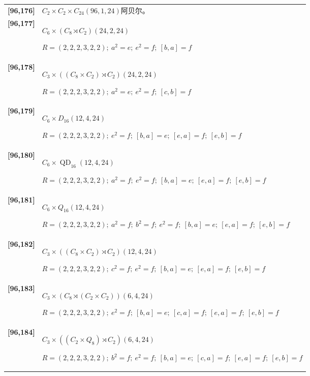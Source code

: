 \documentclass[UTF8,fontset=fandol,11pt,a4paper]{ctexart}
\begin{document}
\begin{longtable}{@{}p{17mm}>{\raggedright\arraybackslash}p{141mm}@{}}
\textbf{[96,176]} & $C_{2}\times C_{2}\times C_{24}$\quad $(96,1,24)$\quad 阿贝尔。\\[3pt]

\textbf{[96,177]} & $C_{6}\times (C_{8}\rtimes C_{2})$\quad $(24,2,24)$\par\(R=(2,2,2,3,2,2);\allowbreak\ a^{2}=e;\allowbreak\ e^{2}=f;\allowbreak\ [b,a]=f\)\\[3pt]

\textbf{[96,178]} & $C_{3}\times ((C_{8}\times C_{2})\rtimes C_{2})$\quad $(24,2,24)$\par\(R=(2,2,2,3,2,2);\allowbreak\ a^{2}=e;\allowbreak\ e^{2}=f;\allowbreak\ [c,b]=f\)\\[3pt]

\textbf{[96,179]} & $C_{6}\times D_{16}$\quad $(12,4,24)$\par\(R=(2,2,2,3,2,2);\allowbreak\ e^{2}=f;\allowbreak\ [b,a]=e;\allowbreak\ [e,a]=f;\allowbreak\ [e,b]=f\)\\[3pt]

\textbf{[96,180]} & $C_{6}\times \operatorname{QD}_{16}$\quad $(12,4,24)$\par\(R=(2,2,2,3,2,2);\allowbreak\ a^{2}=f;\allowbreak\ e^{2}=f;\allowbreak\ [b,a]=e;\allowbreak\ [e,a]=f;\allowbreak\ [e,b]=f\)\\[3pt]

\textbf{[96,181]} & $C_{6}\times Q_{16}$\quad $(12,4,24)$\par\(R=(2,2,2,3,2,2);\allowbreak\ a^{2}=f;\allowbreak\ b^{2}=f;\allowbreak\ e^{2}=f;\allowbreak\ [b,a]=e;\allowbreak\ [e,a]=f;\allowbreak\ [e,b]=f\)\\[3pt]

\textbf{[96,182]} & $C_{3}\times ((C_{8}\times C_{2})\rtimes C_{2})$\quad $(12,4,24)$\par\(R=(2,2,2,3,2,2);\allowbreak\ c^{2}=f;\allowbreak\ e^{2}=f;\allowbreak\ [b,a]=e;\allowbreak\ [e,a]=f;\allowbreak\ [e,b]=f\)\\[3pt]

\textbf{[96,183]} & $C_{3}\times (C_{8}\rtimes (C_{2}\times C_{2}))$\quad $(6,4,24)$\par\(R=(2,2,2,3,2,2);\allowbreak\ e^{2}=f;\allowbreak\ [b,a]=e;\allowbreak\ [c,a]=f;\allowbreak\ [e,a]=f;\allowbreak\ [e,b]=f\)\\[3pt]

\textbf{[96,184]} & $C_{3}\times ((C_{2}\times Q_{8})\rtimes C_{2})$\quad $(6,4,24)$\par\(R=(2,2,2,3,2,2);\allowbreak\ b^{2}=f;\allowbreak\ e^{2}=f;\allowbreak\ [b,a]=e;\allowbreak\ [c,a]=f;\allowbreak\ [e,a]=f;\allowbreak\ [e,b]=f\)\\[3pt]


\end{longtable}
\end{document}

